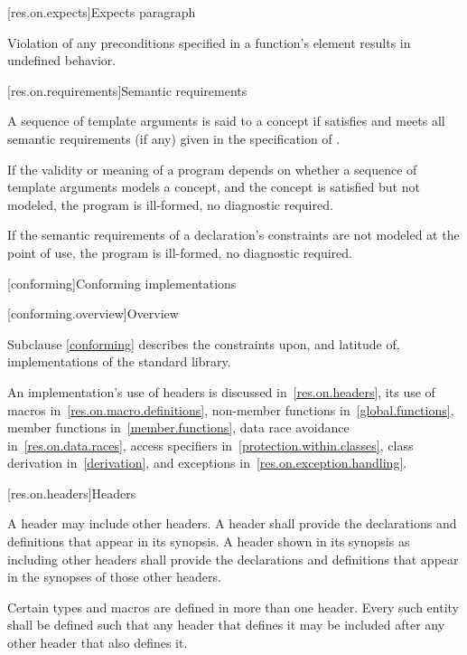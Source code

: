 [res.on.expects]{Expects paragraph}

\pnum
Violation of any preconditions specified in a function's \expects element
results in undefined behavior.

[res.on.requirements]{Semantic requirements}

\pnum
A sequence  of template arguments is said to
%
 a concept 
if 
satisfies  and
meets all semantic requirements (if any)
given in the specification of .

\pnum
If the validity or meaning of a program
depends on whether a sequence of template arguments models a concept, and
the concept is satisfied but not modeled,
the program is ill-formed, no diagnostic required.

\pnum
If the semantic requirements of a declaration's
constraints are not modeled at the point of use,
the program is ill-formed, no diagnostic required.

[conforming]{Conforming implementations}

[conforming.overview]{Overview}

\pnum
Subclause \ref{conforming} describes the constraints upon, and latitude of, implementations of the \Cpp{} standard library.

\pnum
An implementation's use of headers is discussed in~\ref{res.on.headers}, its use
of macros in~\ref{res.on.macro.definitions}, non-member functions
in~\ref{global.functions}, member functions in~\ref{member.functions}, data race
avoidance in~\ref{res.on.data.races}, access specifiers
in~\ref{protection.within.classes}, class derivation in~\ref{derivation}, and
exceptions in~\ref{res.on.exception.handling}.

[res.on.headers]{Headers}

\pnum
A \Cpp{} header may include other \Cpp{} headers.
A \Cpp{} header shall provide the declarations and definitions that appear in its
synopsis. A \Cpp{} header shown in its synopsis as including other \Cpp{} headers
shall provide the declarations and definitions that appear in the synopses of
those other headers.

\pnum
Certain types and macros are defined in more than one header.
Every such entity shall be defined such that any header that defines it may be
included after any other header that also defines it.

